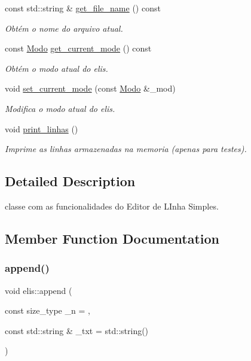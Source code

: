 \begin{DoxyCompactItemize}
const std\+::string \& \hyperlink{classelis_ad8e03261882991d20a6ea83861a5112e}{get\+\_\+file\+\_\+name} () const
\begin{DoxyCompactList}\small\item\em Obtém o nome do arquivo atual. \end{DoxyCompactList}\item 
const \hyperlink{classelis_a1d42edb1a12746c566712c4b4250769e}{Modo} \hyperlink{classelis_a00d301532dcaf2b3079f702bc9e578e2}{get\+\_\+current\+\_\+mode} () const
\begin{DoxyCompactList}\small\item\em Obtém o modo atual do elis. \end{DoxyCompactList}\item 
void \hyperlink{classelis_a4ef54bc5f180b68de8c15510b0d25059}{set\+\_\+current\+\_\+mode} (const \hyperlink{classelis_a1d42edb1a12746c566712c4b4250769e}{Modo} \&\+\_\+mod)
\begin{DoxyCompactList}\small\item\em Modifica o modo atual do elis. \end{DoxyCompactList}\item 
\mbox{\label{classelis_a32d5c4a0f9d37079b6115495a226b1e9}} 
void \hyperlink{classelis_a32d5c4a0f9d37079b6115495a226b1e9}{print\+\_\+linhas} ()
\begin{DoxyCompactList}\small\item\em Imprime as linhas armazenadas na memoria (apenas para testes). \end{DoxyCompactList}\end{DoxyCompactItemize}


\subsection{Detailed Description}
classe com as funcionalidades do Editor de L\+Inha Simples. 

\subsection{Member Function Documentation}
\mbox{\label{classelis_a4efd2a55425f6bac58ededbc804ed794}} 
\subsubsection{\texorpdfstring{append()}{append()}}
{\footnotesize\ttfamily void elis\+::append (\begin{DoxyParamCaption}\item[{const size\+\_\+type}]{\+\_\+n = {},  }\item[{const std\+::string \&}]{\+\_\+txt = {\ttfamily std\+:\+:string()} }\end{DoxyParamCaption})}



